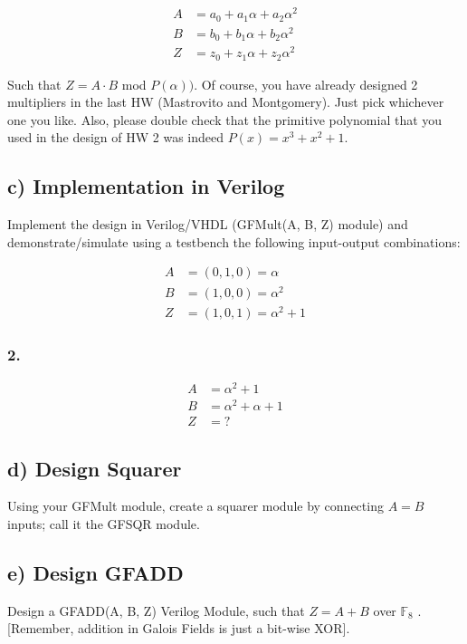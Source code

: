 \documentclass[a4paper,11pt]{exam}
\begin{document}
\begin{align*}
A &= a_0 + a_1 \alpha + a_2\alpha^2\\
B &= b_0 + b_1 \alpha + b_2\alpha^2\\
Z &= z_0 + z_1 \alpha + z_2\alpha^2
\end{align*}

Such that \(Z = A \cdot B\) mod \(P(\alpha))\). Of course, you have already designed 2 multipliers in the last HW (Mastrovito and Montgomery). Just pick whichever one you like. Also, please double check that the primitive polynomial that you used in the design of HW 2 was indeed \(P(x) = x^3 + x^2 + 1\).


\subsection{c) Implementation in Verilog}
\label{sec:org207e1d6}
Implement the design in Verilog/VHDL (GFMult(A, B, Z) module) and demonstrate/simulate using a testbench the following input-output combinations:


\begin{align*}
 A &= (0, 1, 0) = \alpha \\
 B &= (1, 0, 0) = \alpha^2\\
 Z &= (1, 0, 1) = \alpha^2 + 1
\end{align*}
\subsubsection{2.}
\label{sec:orgcba8b4a}

\begin{align*}
A &= \alpha^2 + 1\\
B &= \alpha^2 + \alpha + 1
\\Z &= ?
\end{align*}
\subsection{d) Design Squarer}
\label{sec:orgba4a6d2}
Using your GFMult module, create a squarer module by connecting \(A = B\) inputs; call it the
GFSQR module.

\subsection{e) Design GFADD}
\label{sec:orgbbc5812}
Design a GFADD(A, B, Z) Verilog Module, such that \(Z = A+B\) over \(\mathbb{F}_8\) . [Remember, addition
in Galois Fields is just a bit-wise XOR].
\end{document}
